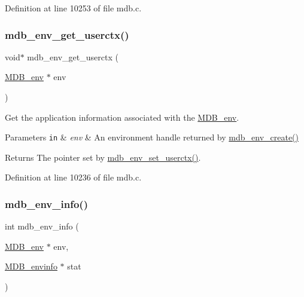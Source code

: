 Definition at line 10253 of file mdb.\+c.

\mbox{\label{group__mdb_ga45df6a4fb150cda2316b5ae224ba52f1}} 
\subsubsection{\texorpdfstring{mdb\+\_\+env\+\_\+get\+\_\+userctx()}{mdb\_env\_get\_userctx()}}
{\footnotesize\ttfamily void$\ast$ mdb\+\_\+env\+\_\+get\+\_\+userctx (\begin{DoxyParamCaption}\item[{\mbox{\hyperlink{struct_m_d_b__env}{M\+D\+B\+\_\+env}} $\ast$}]{env }\end{DoxyParamCaption})}



Get the application information associated with the \mbox{\hyperlink{struct_m_d_b__env}{M\+D\+B\+\_\+env}}. 


\begin{DoxyParams}[1]{Parameters}
\mbox{\tt in}  & {\em env} & An environment handle returned by \mbox{\hyperlink{group__mdb_gaad6be3d8dcd4ea01f8df436f41d158d4}{mdb\+\_\+env\+\_\+create()}} \\
\hline
\end{DoxyParams}
\begin{DoxyReturn}{Returns}
The pointer set by \mbox{\hyperlink{group__mdb_gaf2fe09eb9c96eeb915a76bf713eecc46}{mdb\+\_\+env\+\_\+set\+\_\+userctx()}}. 
\end{DoxyReturn}


Definition at line 10236 of file mdb.\+c.

\mbox{\label{group__mdb_ga18769362c7e7d6cf91889a028a5c5947}} 
\subsubsection{\texorpdfstring{mdb\+\_\+env\+\_\+info()}{mdb\_env\_info()}}
{\footnotesize\ttfamily int mdb\+\_\+env\+\_\+info (\begin{DoxyParamCaption}\item[{\mbox{\hyperlink{struct_m_d_b__env}{M\+D\+B\+\_\+env}} $\ast$}]{env,  }\item[{\mbox{\hyperlink{struct_m_d_b__envinfo}{M\+D\+B\+\_\+envinfo}} $\ast$}]{stat }\end{DoxyParamCaption})}



